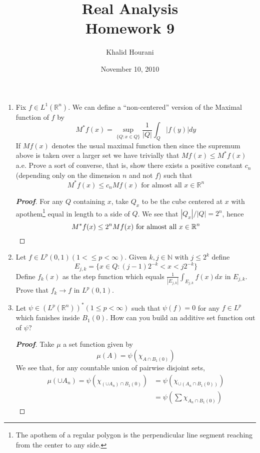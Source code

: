 \documentclass[12pt,leqno]{book}
\title{Real Analysis\\\large Homework 9}
\date{November 10, 2010}
\author{Khalid Hourani}
\theoremstyle{definition}
\newcommand{\N}{\mathbb{N}}
\newcommand{\R}{\mathbb{R}}
\newenvironment{Proof}{\begin{proof}[\textnormal{\textbf{Proof}}]}{\end{proof}}
\begin{document}
\begin{titlepage}
 \maketitle\thispagestyle{empty}
\end{titlepage}
\thispagestyle{empty}
\clearpage\mbox{}\clearpage

\setcounter{page}{1}
\begin{enumerate}
 \item Fix $f\in L^1(\R^n)$. We can define a ``non-centered'' version of the Maximal function of $f$ by \[M^*f(x)=\sup_{\{Q:x\in Q\}}\frac{1}{|Q|}\int_Q|f(y)|dy\] If $Mf(x)$ denotes the usual maximal function then since the supremum above is taken over a larger set we have trivially that $Mf(x)\leq M^*f(x)$ a.e. Prove a sort of converse, that is, show there exists a positive constant $c_n$ (depending only on the dimension $n$ and not $f$) such that \[M^*f(x)\leq c_nMf(x)\text{ for almost all }x\in\R^n\]

\begin{Proof}
 For any $Q$ containing $x$, take $Q_x$ to be the cube centered at $x$ with apothem\footnote{The apothem of a regular polygon is the perpendicular line segment reaching from the center to any side.} equal in length to a side of $Q$. We see that $|Q_x|/|Q|=2^n$, hence \[M^*f(x)\leq 2^nMf(x)\text{ for almost all }x\in\R^n\qedhere\]
\end{Proof}

 \item Let $f\in L^p(0,1) (1<\leq p<\infty)$. Given $k,j\in\N$ with $j\leq2^k$ define \[E_{j,k}=\{x\in Q:(j-1)2^{-k}<x<j2^{-k}\}\] Define $f_k(x)$ as the step function which equals $\frac{1}{|E_{j,k}|}\int_{E_{j,k}}f(x)dx$ in $E_{j,k}$. Prove that $f_k\to f$ in $L^p(0,1)$.
 \item Let $\psi\in(L^p(\R^n))^*(1\leq p<\infty)$ such that $\psi(f)=0$ for any $f\in L^p$ which fanishes inside $B_1(0)$. How can you build an additive set function out of $\psi$?

\begin{Proof}
 Take $\mu$ a set function given by \[\mu(A)=\psi(\chi_{A\cap B_1(0)})\] We see that, for any countable union of pairwise disjoint sets, \begin{align*}\mu\left(\cup A_n\right)=\psi\left(\chi_{(\cup A_n)\cap B_1(0)}\right)&=\psi\left(\chi_{\cup(A_n\cap B_1(0))}\right)\\&=\psi\left(\sum\chi_{A_n\cap B_1(0)}\right)\end{align*}
\end{Proof}


\end{enumerate}
\end{document}
